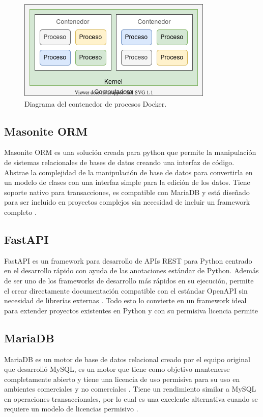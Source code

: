 \begin{figure}[!ht]
	\centering
	\includegraphics[width=.45\linewidth]{images/diagrams/docker.png}
	\caption{Diagrama del contenedor de procesos Docker.}
	\label{fig:docker_diagrama}
\end{figure}

\subsection{Masonite ORM}

Masonite ORM es una solución creada para python que permite la manipulación de sistemas relacionales de bases de datos creando una interfaz de código. Abstrae la complejidad de la manipulación de base de datos para convertirla en un modelo de clases con una interfaz simple para la edición de los datos. Tiene soporte nativo para transacciones, es compatible con MariaDB y está diseñado para ser incluido en proyectos complejos sin necesidad de incluir un framework completo \cite{masonite_2021}.

\subsection{FastAPI}

FastAPI es un framework para desarrollo de APIs REST para Python centrado en el desarrollo rápido con ayuda de las anotaciones estándar de Python. Además de ser uno de los frameworks de desarrollo más rápidos en su ejecución, permite el crear directamente documentación compatible con el estándar OpenAPI sin necesidad de librerías externas \cite{fastapi_ramirez_2020}. Todo esto lo convierte en un framework ideal para extender proyectos existentes en Python y con su permisiva licencia permite %

\subsection{MariaDB}


MariaDB es un motor de base de datos relacional creado por el equipo original que desarrolló MySQL, es un motor que tiene como objetivo mantenerse completamente abierto y tiene una licencia de uso permisiva para su uso en ambientes comerciales y no comerciales \cite{mariadb_foundation_2019}. Tiene un rendimiento similar a MySQL en operaciones transaccionales, por lo cual es una excelente alternativa cuando se requiere un modelo de licencias permisivo \cite{mariadb_comparison}.



